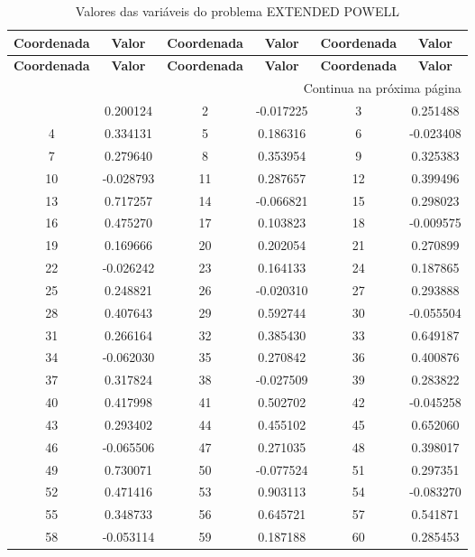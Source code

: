 \documentclass[12pt]{article}
\begin{document}
\small
\begin{longtable}{@{}cc|cc|cc@{}}
\caption{Valores das variáveis do problema EXTENDED POWELL} \\
\toprule
\textbf{Coordenada} & \textbf{Valor} & \textbf{Coordenada} & \textbf{Valor} & \textbf{Coordenada} & \textbf{Valor} \\
\midrule
\endfirsthead

\toprule
\textbf{Coordenada} & \textbf{Valor} & \textbf{Coordenada} & \textbf{Valor} & \textbf{Coordenada} & \textbf{Valor} \\
\midrule
\endhead

\midrule \multicolumn{6}{r}{{Continua na próxima página}} \\ \midrule
\endfoot

\bottomrule
\endlastfoot
1 & 0.200124 & 2 & -0.017225 & 3 & 0.251488 \\
4 & 0.334131 & 5 & 0.186316 & 6 & -0.023408 \\
7 & 0.279640 & 8 & 0.353954 & 9 & 0.325383 \\
10 & -0.028793 & 11 & 0.287657 & 12 & 0.399496 \\
13 & 0.717257 & 14 & -0.066821 & 15 & 0.298023 \\
16 & 0.475270 & 17 & 0.103823 & 18 & -0.009575 \\
19 & 0.169666 & 20 & 0.202054 & 21 & 0.270899 \\
22 & -0.026242 & 23 & 0.164133 & 24 & 0.187865 \\
25 & 0.248821 & 26 & -0.020310 & 27 & 0.293888 \\
28 & 0.407643 & 29 & 0.592744 & 30 & -0.055504 \\
31 & 0.266164 & 32 & 0.385430 & 33 & 0.649187 \\
34 & -0.062030 & 35 & 0.270842 & 36 & 0.400876 \\
37 & 0.317824 & 38 & -0.027509 & 39 & 0.283822 \\
40 & 0.417998 & 41 & 0.502702 & 42 & -0.045258 \\
43 & 0.293402 & 44 & 0.455102 & 45 & 0.652060 \\
46 & -0.065506 & 47 & 0.271035 & 48 & 0.398017 \\
49 & 0.730071 & 50 & -0.077524 & 51 & 0.297351 \\
52 & 0.471416 & 53 & 0.903113 & 54 & -0.083270 \\
55 & 0.348733 & 56 & 0.645721 & 57 & 0.541871 \\
58 & -0.053114 & 59 & 0.187188 & 60 & 0.285453 \\

\end{longtable}
\end{document}
